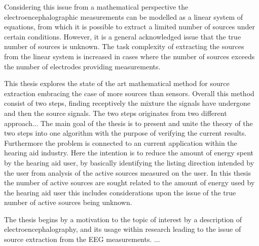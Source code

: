 Considering this issue from a mathematical perspective the electroencephalographic measurements can be modelled as a linear system of equations, from which it is possible to extract a limited number of sources under certain conditions. However, it is a general acknowledged issue that the true number of sources is unknown.
The task complexity of extracting the sources from the linear system is increased in cases where the number of sources exceeds the number of electrodes providing measurements.

This thesis explores the state of the art mathematical method for source extraction embracing the case of more sources than sensors. Overall this method consist of two steps, finding receptively the mixture the signals have undergone and then the source signals. The two steps originates from two different approach...
The main goal of the thesis is to present and unite the theory of the two steps into one algorithm with the purpose of verifying the current results. Furthermore the problem is connected to an current application within the hearing aid industry. Here the intention is to reduce the amount of energy spent by the hearing aid user, by  basically identifying the listing direction intended by the user from analysis of the active sources measured on the user.
In this thesis the number of active sources are sought related to the amount of energy used by the hearing aid user   
this includes considerations upon the issue of the true number of active sources being unknown. 

The thesis begins by a motivation to the topic of interest by a description of electroencephalography, and its usage within research leading to the issue of source extraction from the EEG measurements. ...

       
      





              

